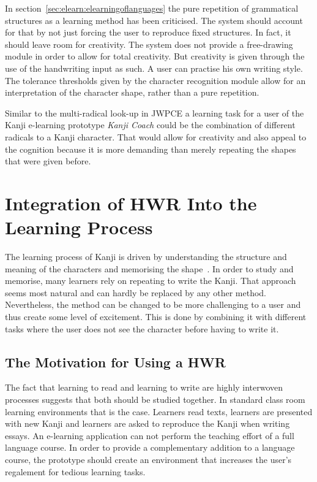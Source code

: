 In section~\ref{sec:elearn:elearningoflanguages} the pure repetition of 
grammatical structures as a learning method has been criticised.
The system should account for that by not just forcing the user to
reproduce fixed structures. In fact, it should leave room for creativity.
The system does not provide a free-drawing module in order to allow for
total creativity. But creativity is given through the use of the
handwriting input as such. A user can practise his own writing style.
The tolerance thresholds given by the character recognition module allow for an
interpretation of the character shape, rather than a pure repetition.

Similar to the multi-radical look-up in JWPCE a learning task for a user
of the Kanji e-learning prototype \emph{Kanji Coach} could be the combination 
of different radicals to a Kanji character.
That would allow for creativity and also appeal to the cognition because
it is more demanding than merely repeating the shapes that were given before.


\section{Integration of HWR Into the Learning Process}
\label{sec:concept:integrationofhwrintolearning}

The learning process of Kanji is driven by understanding the structure and 
meaning of the characters and memorising the shape~. 
In order to study and memorise, many learners rely on repeating to write the 
Kanji. That approach seems most natural and can hardly be replaced by any other 
method. Nevertheless, the method can be changed to be more challenging to
a user and thus create some level of excitement. This is done by combining
it with different tasks where the user does not see the character before
having to write it.

\subsection{The Motivation for Using a HWR}
\label{sec:concept:motivationforusinghwr}

The fact that learning to read and learning to write are highly interwoven 
processes suggests that both should be studied together. In standard class room 
learning environments that is the case. Learners read texts, learners are 
presented with new Kanji and learners are asked to reproduce the Kanji when 
writing essays.
An e-learning application can not perform the teaching effort of a full language
course. In order to provide a complementary addition to a language course,
the prototype should create an environment that increases the user's regalement 
for tedious learning tasks.

